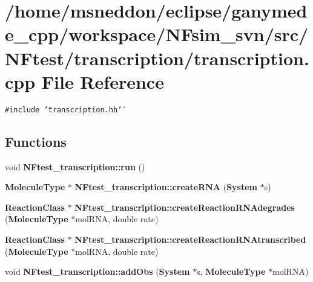 \section{/home/msneddon/eclipse/ganymede\_\-cpp/workspace/NFsim\_\-svn/src/NFtest/transcription/transcription.cpp File Reference}
\label{transcription_8cpp}


{\tt \#include \char`\"{}transcription.hh\char`\"{}}\par
\subsection*{Functions}
\begin{CompactItemize}
\item 
void {\bf NFtest\_\-transcription::run} ()
\item 
{\bf MoleculeType} $\ast$ {\bf NFtest\_\-transcription::createRNA} ({\bf System} $\ast$s)
\item 
{\bf ReactionClass} $\ast$ {\bf NFtest\_\-transcription::createReactionRNAdegrades} ({\bf MoleculeType} $\ast$molRNA, double rate)
\item 
{\bf ReactionClass} $\ast$ {\bf NFtest\_\-transcription::createReactionRNAtranscribed} ({\bf MoleculeType} $\ast$molRNA, double rate)
\item 
void {\bf NFtest\_\-transcription::addObs} ({\bf System} $\ast$s, {\bf MoleculeType} $\ast$molRNA)
\end{CompactItemize}
